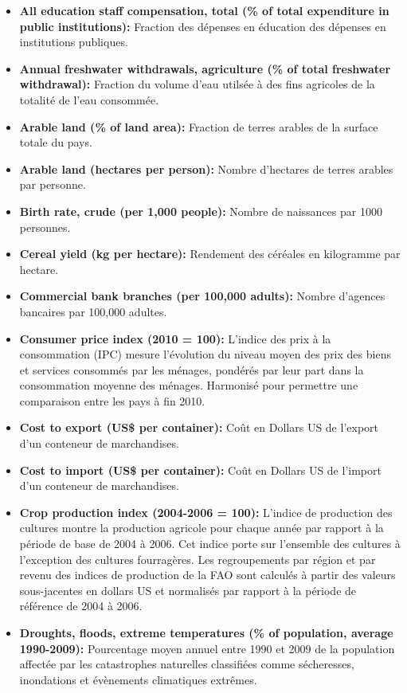 \begin{itemize}
		\item \textbf{ All education staff compensation, total (\% of total expenditure in public institutions):} Fraction des dépenses en éducation des dépenses en institutions publiques.
		\item \textbf{ Annual freshwater withdrawals, agriculture (\% of total freshwater withdrawal):} Fraction du volume d'eau utilsée à des fins agricoles de la totalité de l'eau consommée.
		\item \textbf{ Arable land (\% of land area):} Fraction de terres arables de la surface totale du pays.
		\item \textbf{ Arable land (hectares per person):} Nombre d'hectares de terres arables par personne.
		\item \textbf{ Birth rate, crude (per 1,000 people):} Nombre de naissances par 1000 personnes.
		\item \textbf{ Cereal yield (kg per hectare):} Rendement des céréales en kilogramme par hectare.
		\item \textbf{ Commercial bank branches (per 100,000 adults):} Nombre d'agences bancaires par 100,000 adultes.
		\item \textbf{ Consumer price index (2010 = 100):} L'indice des prix à la consommation (IPC) mesure l'évolution du niveau moyen des prix des biens et services consommés par les ménages, pondérés par leur part dans la consommation moyenne des ménages. Harmonisé pour permettre une comparaison entre les pays à fin 2010.
		\item \textbf{ Cost to export (US\$ per container):} Coût en Dollars US de l'export d'un conteneur de marchandises.
		\item \textbf{ Cost to import (US\$ per container):} Coût en Dollars US de l'import d'un conteneur de marchandises.
		\item \textbf{ Crop production index (2004-2006 = 100):} 
		L'indice de production des cultures montre la production agricole pour chaque année par rapport à la période de base de 2004 à 2006. Cet indice porte sur l'ensemble des cultures à l'exception des cultures fourragères. Les regroupements par région et par revenu des indices de production de la FAO sont calculés à partir des valeurs sous-jacentes en dollars US et normalisés par rapport à la période de référence de 2004 à 2006.
		\item \textbf{ Droughts, floods, extreme temperatures (\% of population, average 1990-2009):} Pourcentage moyen annuel entre 1990 et 2009 de la population affectée par les catastrophes naturelles classifiées comme sécheresses, inondations et évènements climatiques extrêmes.

\end{itemize}
